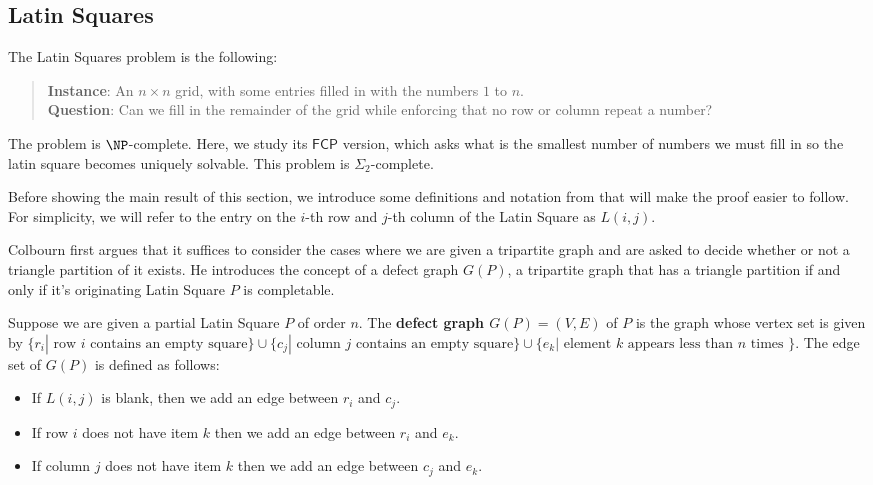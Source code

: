 \documentclass[runningheads,a4paper]{llncs}
\begin{document}
\subsection{Latin Squares}

The Latin Squares problem is the following:
\begin{quote}
\textbf{Instance}: An $n \times n$ grid, with some entries filled in with the numbers $1$ to $n$.\\
\textbf{Question}: Can we fill in the remainder of the grid while enforcing that no row or column repeat a number?
\end{quote}
The problem is $\NP$-complete. Here, we study its  $\mathsf{FCP}$ version, which asks what is the smallest number of numbers we must fill in so the latin square becomes uniquely solvable. This problem is $\Sigma_2$-complete. 

Before showing the main result of this section, we introduce some definitions and notation from \cite{colbourn1984complexity} that will make the proof easier to follow. For simplicity, we will refer to the entry on the $i$-th row and $j$-th column of the Latin Square as $L(i,j)$. 

Colbourn \cite{colbourn1984complexity} first argues that it suffices to consider the cases where we are given a tripartite graph and are asked to decide whether or not a triangle partition of it exists. He introduces the concept of a defect graph $G(P)$, a tripartite graph that has a triangle partition if and only if it's originating Latin Square $P$ is completable. 

Suppose we are given a partial Latin Square $P$ of order $n$. The \textbf{defect graph $G(P) = (V,E)$} of $P$ is the graph whose vertex set is given by $\{ r_i | \text{ row } i \text{ contains an empty square} \} \cup \{ c_j | \text{ column } j \text{ contains an empty square} \} \cup \{ e_k | \text{ element } k\text{ appears less than } n \text{ times } \} $. The edge set of $G(P)$ is defined as follows: 

\begin{itemize}
	\item If $L(i,j)$ is blank, then we add an edge between $r_i$ and $c_j$. 
	\item If row $i$ does not have item $k$ then we add an edge between $r_i$ and $e_k$. 
	\item If column $j$ does not have item $k$ then we add an edge between $c_j$ and $e_k$.
\end{itemize}
\end{document}
